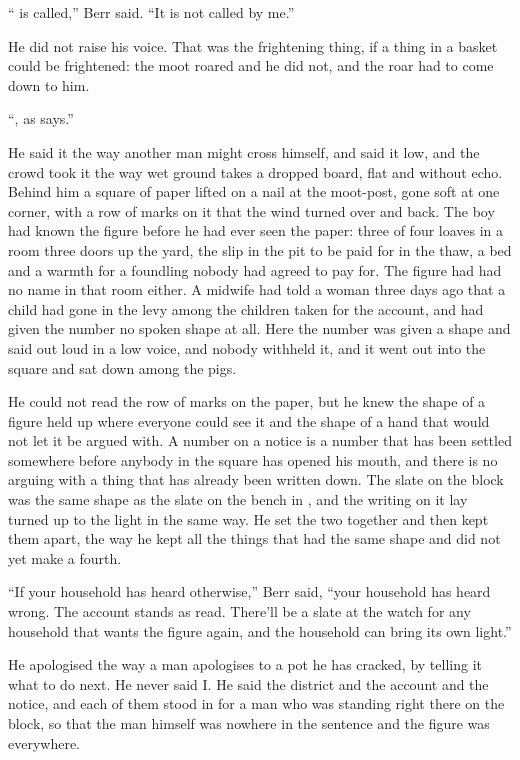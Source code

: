 “ is called,” Berr said. “It is not called by me.”

He did not raise his voice. That was the frightening thing, if a thing in a basket could be frightened: the moot roared and he did not, and the roar had to come down to him.

“, as  says.”

He said it the way another man might cross himself, and said it low, and the crowd took it the way wet ground takes a dropped board, flat and without echo. Behind him a square of paper lifted on a nail at the moot-post, gone soft at one corner, with a row of marks on it that the wind turned over and back. The boy had known the figure before he had ever seen the paper: three of four loaves in a room three doors up the yard, the slip in the pit to be paid for in the thaw, a bed and a warmth for a foundling nobody had agreed to pay for. The figure had had no name in that room either. A midwife had told a woman three days ago that a child had gone in the levy among the children taken for the account, and had given the number no spoken shape at all. Here the number was given a shape and said out loud in a low voice, and nobody withheld it, and it went out into the square and sat down among the pigs.

He could not read the row of marks on the paper, but he knew the shape of a figure held up where everyone could see it and the shape of a hand that would not let it be argued with. A number on a notice is a number that has been settled somewhere before anybody in the square has opened his mouth, and there is no arguing with a thing that has already been written down. The slate on the block was the same shape as the slate on the bench in , and the writing on it lay turned up to the light in the same way. He set the two together and then kept them apart, the way he kept all the things that had the same shape and did not yet make a fourth.

“If your household has heard otherwise,” Berr said, “your household has heard wrong. The account stands as read. There'll be a slate at the watch for any household that wants the figure again, and the household can bring its own light.”

He apologised the way a man apologises to a pot he has cracked, by telling it what to do next. He never said I. He said the district and the account and the notice, and each of them stood in for a man who was standing right there on the block, so that the man himself was nowhere in the sentence and the figure was everywhere.

